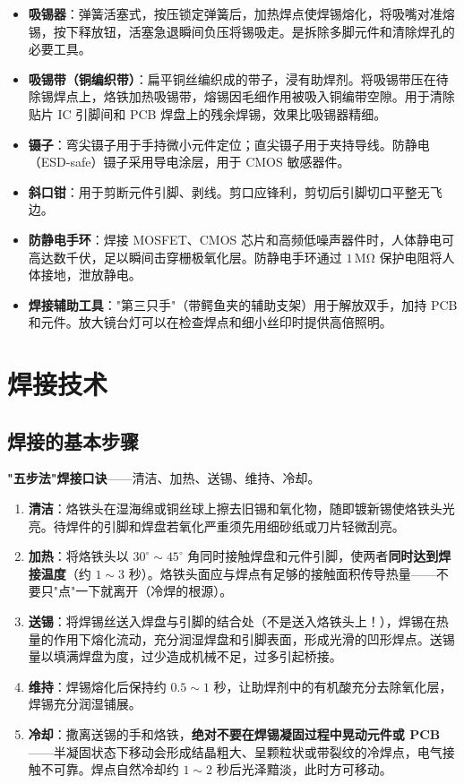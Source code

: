 \documentclass[12pt,UTF8]{ctexbook}
\begin{document}
\begin{itemize}
  \item \textbf{吸锡器}：弹簧活塞式，按压锁定弹簧后，加热焊点使焊锡熔化，将吸嘴对准熔锡，按下释放钮，活塞急退瞬间负压将锡吸走。是拆除多脚元件和清除焊孔的必要工具。
  \item \textbf{吸锡带（铜编织带）}：扁平铜丝编织成的带子，浸有助焊剂。将吸锡带压在待除锡焊点上，烙铁加热吸锡带，熔锡因毛细作用被吸入铜编带空隙。用于清除贴片 IC 引脚间和 PCB 焊盘上的残余焊锡，效果比吸锡器精细。
  \item \textbf{镊子}：弯尖镊子用于手持微小元件定位；直尖镊子用于夹持导线。防静电（ESD-safe）镊子采用导电涂层，用于 CMOS 敏感器件。
  \item \textbf{斜口钳}：用于剪断元件引脚、剥线。剪口应锋利，剪切后引脚切口平整无飞边。
  \item \textbf{防静电手环}：焊接 MOSFET、CMOS 芯片和高频低噪声器件时，人体静电可高达数千伏，足以瞬间击穿栅极氧化层。防静电手环通过 $1\,\mathrm{M\Omega}$ 保护电阻将人体接地，泄放静电。
  \item \textbf{焊接辅助工具}："第三只手"（带鳄鱼夹的辅助支架）用于解放双手，加持 PCB 和元件。放大镜台灯可以在检查焊点和细小丝印时提供高倍照明。
\end{itemize}

\section{焊接技术}
\label{sec:soldering_technique}

\subsection{焊接的基本步骤}

\textbf{"五步法"焊接口诀}——清洁、加热、送锡、维持、冷却。

\begin{enumerate}
  \item \textbf{清洁}：烙铁头在湿海绵或铜丝球上擦去旧锡和氧化物，随即镀新锡使烙铁头光亮。待焊件的引脚和焊盘若氧化严重须先用细砂纸或刀片轻微刮亮。
  \item \textbf{加热}：将烙铁头以 $30^\circ\sim45^\circ$ 角同时接触焊盘和元件引脚，使两者\textbf{同时达到焊接温度}（约 $1\sim3$ 秒）。烙铁头面应与焊点有足够的接触面积传导热量——不要只"点"一下就离开（冷焊的根源）。
  \item \textbf{送锡}：将焊锡丝送入焊盘与引脚的结合处（不是送入烙铁头上！），焊锡在热量的作用下熔化流动，充分润湿焊盘和引脚表面，形成光滑的凹形焊点。送锡量以填满焊盘为度，过少造成机械不足，过多引起桥接。
  \item \textbf{维持}：焊锡熔化后保持约 $0.5\sim1$ 秒，让助焊剂中的有机酸充分去除氧化层，焊锡充分润湿铺展。
  \item \textbf{冷却}：撒离送锡的手和烙铁，\textbf{绝对不要在焊锡凝固过程中晃动元件或 PCB}——半凝固状态下移动会形成结晶粗大、呈颗粒状或带裂纹的冷焊点，电气接触不可靠。焊点自然冷却约 $1\sim2$ 秒后光泽黯淡，此时方可移动。
\end{enumerate}
\end{document}
